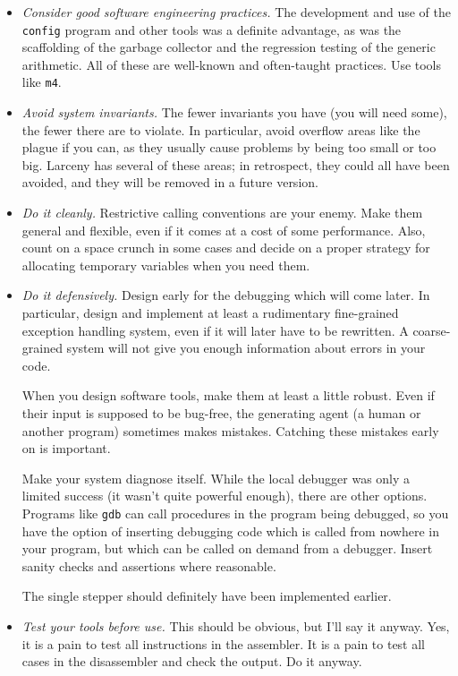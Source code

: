 \begin{itemize}

\item
{\em Consider good software engineering practices.} The development and use
of the {\tt config} program and other tools was a definite advantage, as was
the scaffolding of the garbage collector and the regression testing of the
generic arithmetic. All of these are well-known and often-taught practices.
Use tools like {\tt m4}.

\item
{\em Avoid system invariants.} The fewer invariants you have (you will need
some), the fewer there are to violate. In particular, avoid overflow areas
like the plague if you can, as they usually cause problems by being too
small or too big. Larceny has several of these areas; in retrospect, they
could all have been avoided, and they will be removed in a future version.

\item
{\em Do it cleanly.} Restrictive calling conventions are your enemy. Make
them general and flexible, even if it comes at a cost of some performance.
Also, count on a space crunch in some cases and decide on a proper strategy
for allocating temporary variables when you need them.

\item
{\em Do it defensively.} Design early for the debugging which will come
later.  In particular, design and implement at least a rudimentary
fine-grained exception handling system, even if it will later have to be
rewritten. A coarse-grained system will not give you enough information
about errors in your code.

When you design software tools, make them at least a little robust.
Even if their input is supposed to be bug-free, the generating agent (a human
or another program) sometimes makes mistakes. Catching these mistakes early
on is important.

Make your system diagnose itself. While the local debugger was only a
limited success (it wasn't quite powerful enough), there are other options.
Programs like {\tt gdb} can call procedures in the program being debugged,
so you have the option of inserting debugging code which is called from
nowhere in your program, but which can be called on demand from a debugger.
Insert sanity checks and assertions where reasonable.

The single stepper should definitely have been implemented earlier.

\item
{\em Test your tools before use.} This should be obvious, but I'll say it
anyway. Yes, it is a pain to test all instructions in the assembler.  It is
a pain to test all cases in the disassembler and check the output.  Do it
anyway.

\end{itemize}


